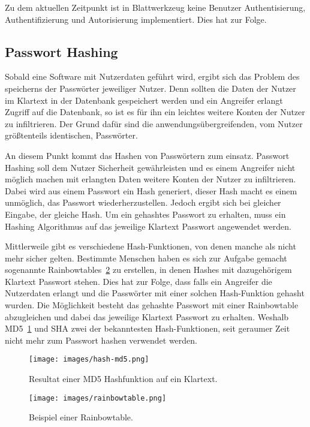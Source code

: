 \documentclass[11pt]{article}
\newcommand{\hlnote}[2]{#1}
\newcommand{\hlnote}[2]{\todo{#2}\texthl{#1}}
\begin{document}
	Zu dem aktuellen Zeitpunkt ist in Blattwerkzeug keine Benutzer Authentisierung, Authentifizierung und Autorisierung implementiert. Dies hat zur Folge.
	
	\subsection{Passwort Hashing}
	\label{sec:password_hashing}
	
	Sobald eine Software mit Nutzerdaten geführt wird, ergibt sich das Problem des speicherns der Passwörter jeweiliger Nutzer.
	Denn sollten die Daten der Nutzer im Klartext in der Datenbank gespeichert werden und ein Angreifer erlangt Zugriff auf die Datenbank, so ist es für ihn ein leichtes weitere Konten der Nutzer zu infiltrieren. Der Grund dafür sind die anwendungsübergreifenden, vom Nutzer größtenteils identischen, Passwörter.
	
	An diesem Punkt kommt das Hashen von Passwörtern zum einsatz. Passwort Hashing soll dem Nutzer Sicherheit gewährleisten und es einem Angreifer nicht möglich machen mit erlangten Daten weitere Konten der Nutzer zu infiltrieren. Dabei wird aus einem Passwort ein Hash generiert, dieser Hash macht es einem unmöglich, das Passwort wiederherzustellen. Jedoch ergibt sich bei gleicher Eingabe, der gleiche Hash. Um ein gehashtes Passwort zu erhalten, muss ein Hashing Algorithmus auf das jeweilige Klartext Passwort angewendet werden.
	
	Mittlerweile gibt es verschiedene Hash-Funktionen, von denen manche als nicht mehr sicher gelten. \hlnote{Bestimmte}{Weasel} Menschen haben es sich zur Aufgabe gemacht sogenannte Rainbowtables~\ref{fig:rainbowtable} zu erstellen, in denen Hashes mit dazugehörigem Klartext Passwort stehen. Dies hat zur Folge, dass falls ein Angreifer die Nutzerdaten erlangt und die Passwörter mit einer solchen Hash-Funktion gehasht wurden. Die Möglichkeit besteht das gehashte Passwort mit einer Rainbowtable abzugleichen und dabei das jeweilige Klartext Passwort zu erhalten. Weshalb MD5~\ref{fig:md5} und SHA zwei der bekanntesten Hash-Funktionen, seit geraumer Zeit nicht mehr zum Passwort hashen verwendet werden.
	
	\begin{figure}[h]
		\texttt{[image: images/hash-md5.png]}
		\caption{Resultat einer MD5 Hashfunktion auf ein Klartext.}
		\label{fig:md5}
	\end{figure}

	\begin{figure}[h]
		\texttt{[image: images/rainbowtable.png]}
		\caption{Beispiel einer Rainbowtable.}
		\label{fig:rainbowtable}
	\end{figure}
	
\end{document}
